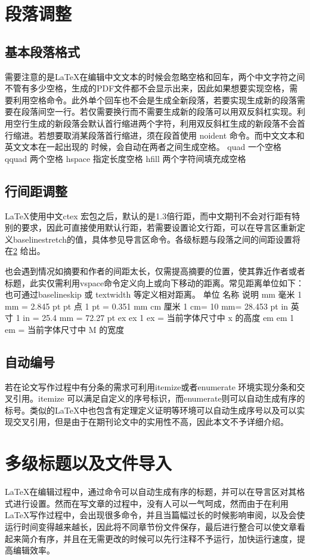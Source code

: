 \section{段落调整}

\subsection{基本段落格式}
需要注意的是\LaTeX 在编辑中文文本的时候会忽略空格和回车，两个中文字符之间不管有多少空格，生成的PDF文件都不会显示出来，因此如果想要实现空格，需要利用空格命令。此外单个回车也不会是生成全新段落，若要实现生成新的段落需要在段落间空一行。若仅需要换行而不需要生成新的段落可以用双反斜杠实现。利用空行生成的新段落会默认首行缩进两个字符，利用双反斜杠生成的新段落不会首行缩进。若想要取消某段落首行缩进，须在段首使用 noident 命令。而中文文本和英文文本在一起出现的 时候，会自动在两者之间生成空格。
quad 一个空格  qquad 两个空格  hspace 指定长度空格   hfill 两个字符间填充成空格

\subsection{行间距调整}
\LaTeX 使用中文ctex 宏包之后，默认的是1.3倍行距，而中文期刊不会对行距有特别的要求，因此可直接使用默认行距，若需要设置论文行距，可以在导言区重新定义baselinestretch的值，具体参见导言区命令。各级标题与段落之间的间距设置将在\ref{多级标题}%
给出。

也会遇到情况如摘要和作者的间距太长，仅需提高摘要的位置，使其靠近作者或者标题，此实仅需利用vspace命令定义向上或向下移动的距离。常见距离单位如下：也可通过baselineskip 或 textwidth 等定义相对距离。
单位 	名称 	说明
mm 	毫米 	1 mm = 2.845 pt
pt 	点 	1 pt = 0.351 mm
cm 	厘米 	1 cm= 10 mm= 28.453 pt
in 	英寸 	1 in = 25.4 mm = 72.27 pt
ex 	ex 	1 ex = 当前字体尺寸中 x 的高度
em 	em 	1 em = 当前字体尺寸中 M 的宽度

\subsection{自动编号} \label{自动编号}
若在论文写作过程中有分条的需求可利用itemize或者enumerate 环境实现分条和交叉引用。itemize 可以满足自定义的序号标识，而enumerate则可以自动生成有序的标号。类似的\LaTeX 中也包含有定理定义证明等环境可以自动生成序号以及可以实现交叉引用，但是由于在期刊论文中的实用性不高，因此本文不予详细介绍。

\section{多级标题以及文件导入} \label{多级标题}
\LaTeX 在编辑过程中，通过命令可以自动生成有序的标题，并可以在导言区对其格式进行设置。然而在写文章的过程中，没有人可以一气呵成，然而由于在利用\LaTeX 写作过程中，会出现很多命令，并且当篇幅过长的时候影响审阅，以及会使运行时间变得越来越长，因此将不同章节份文件保存，最后进行整合可以使文章看起来简介有序，并且在无需更改的时候可以先行注释不予运行，加快运行速度，提高编辑效率。 

